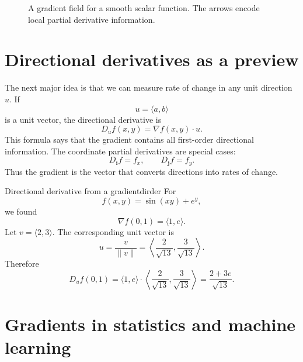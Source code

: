 \documentclass[11pt]{article}
\newcommand{\grad}{\nabla}
\newcommand{\ii}{\mathbf i}
\newcommand{\jj}{\mathbf j}
\begin{document}
\begin{figure}[H]
\centering
{}
\caption{A gradient field for a smooth scalar function. The arrows encode local partial derivative information.}
\end{figure}

\section{Directional derivatives as a preview}

The next major idea is that we can measure rate of change in any unit direction $u$. If
\[
u=\langle a,b\rangle
\]
is a unit vector, the directional derivative is
\[
D_u f(x,y)=\grad f(x,y)\cdot u.
\]
This formula says that the gradient contains all first-order directional information. The coordinate partial derivatives are special cases:
\[
D_{\ii}f=f_x,
\qquad
D_{\jj}f=f_y.
\]
Thus the gradient is the vector that converts directions into rates of change.

\begin{examplebox}{Directional derivative from a gradient}{dirder}
For
\[
f(x,y)=\sin(xy)+e^y,
\]
we found
\[
\grad f(0,1)=\langle 1,e\rangle.
\]
Let $v=\langle 2,3\rangle$. The corresponding unit vector is
\[
u=\frac{v}{\|v\|}=\left\langle\frac{2}{\sqrt{13}},\frac{3}{\sqrt{13}}\right\rangle.
\]
Therefore
\[
D_u f(0,1)=\langle 1,e\rangle\cdot \left\langle\frac{2}{\sqrt{13}},\frac{3}{\sqrt{13}}\right\rangle=
\frac{2+3e}{\sqrt{13}}.
\]
\end{examplebox}

\section{Gradients in statistics and machine learning}
\end{document}
